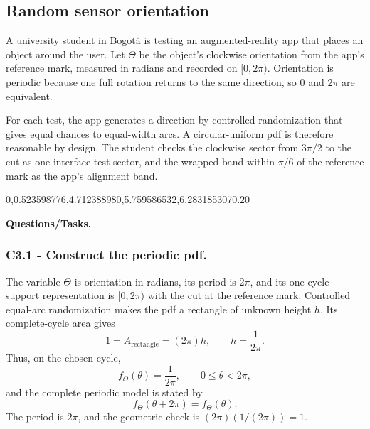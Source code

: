 	\subsection{Random sensor orientation}\label{sec:c3-uniform-sensor}
	A university student in Bogot\'a is testing an augmented-reality app that places
	an object around the user.  Let $\Theta$ be the object's clockwise orientation
	from the app's reference mark, measured in radians and recorded on $[0,2\pi)$.
	Orientation is periodic because one full rotation returns to the same direction,
	so $0$ and $2\pi$ are equivalent.
	
	For each test, the app generates a direction by controlled randomization that
	gives equal chances to equal-width arcs.  A circular-uniform pdf is therefore
	reasonable by design.  The student checks the clockwise sector from $3\pi/2$
	to the cut as one interface-test sector, and the wrapped band within $\pi/6$
	of the reference mark as the app's alignment band.
	
	\begingroup
	{0,0.523598776,4.712388980,5.759586532,6.283185307}{0.20}
	\endgroup
	
	\textbf{Questions/Tasks.}
	\begin{enumerate}
	\end{enumerate}
	
	\subsubsection*{C3.1 - Construct the periodic pdf.}
	\label{subsec:c3-uniform-sensor-a}
	The variable $\Theta$ is orientation in radians, its period is $2\pi$, and
	its one-cycle support representation is $[0,2\pi)$ with the cut at the
	reference mark.
	Controlled equal-arc randomization makes the pdf a rectangle of unknown height
	$h$.  Its complete-cycle area gives
	\[
	1=A_{\text{rectangle}}=(2\pi)h,\qquad h=\frac1{2\pi}.
	\]
	Thus, on the chosen cycle,
	\[
	f_{\Theta}(\theta)=\frac1{2\pi},\qquad 0\le\theta<2\pi,
	\]
	and the complete periodic model is stated by
	\[
	f_{\Theta}(\theta+2\pi)=f_{\Theta}(\theta).
	\]
	The period is $2\pi$, and the geometric check is
	$(2\pi)(1/(2\pi))=1$.
	

